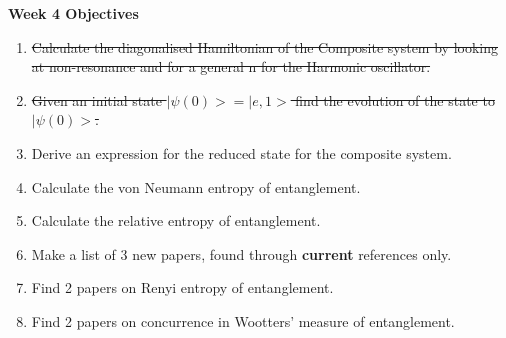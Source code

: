 \documentclass{article}
\begin{document}
\Large{\textbf{Week 4 Objectives}}
\\
\begin{enumerate}
    \item \sout{Calculate the diagonalised Hamiltonian of the Composite system by looking at non-resonance and for a general n for the Harmonic oscillator.}
    \item \sout{Given an initial state $|\psi(0)> = |e,1>$ find the evolution of the state to $|\psi(0)>$.}
    \item Derive an expression for the reduced state for the composite system.
    \item Calculate the von Neumann entropy of entanglement.
    \item Calculate the relative entropy of entanglement.
    \item {Make a list of 3 new papers, found through \textbf{current} references only.}
    \item Find 2 papers on Renyi entropy of entanglement.
    \item Find 2 papers on concurrence in Wootters' measure of entanglement.
    


\end{enumerate}
\end{document}
